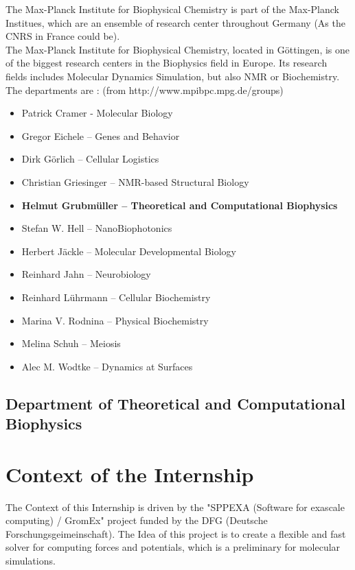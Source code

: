 \documentclass[11pt,twoside,a4paper]{report}
\begin{document}
The Max-Planck Institute for Biophysical Chemistry is part of the Max-Planck Institues, which are an ensemble of research center throughout Germany (As the CNRS in France could be).\\

The Max-Planck Institute for Biophysical Chemistry, located in Göttingen, is one of the biggest research centers in the Biophysics field in Europe. Its research fields includes Molecular Dynamics Simulation, but also NMR or Biochemistry.\\
The departments are : (from http://www.mpibpc.mpg.de/groups)
\begin{itemize}
\item Patrick Cramer - Molecular Biology
\item Gregor Eichele – Genes and Behavior
\item Dirk Görlich – Cellular Logistics
\item Christian Griesinger – NMR-based Structural  Biology
\item \textbf{Helmut Grubmüller – Theoretical and Computational Biophysics}
\item Stefan W. Hell – NanoBiophotonics
\item Herbert Jäckle – Molecular Developmental Biology
\item Reinhard Jahn – Neurobiology
\item Reinhard Lührmann – Cellular Biochemistry
\item Marina V. Rodnina – Physical Biochemistry
\item Melina Schuh – Meiosis 
\item Alec M. Wodtke – Dynamics at Surfaces
\end{itemize}




\section*{Department of Theoretical and Computational Biophysics}


\chapter{Context of the Internship}

The Context of this Internship is driven by the "SPPEXA (Software for exascale computing) / GromEx" project funded by the DFG (Deutsche Forschungsgeimeinschaft).
The Idea of this project is to create a flexible and fast solver for computing forces and potentials, which is a preliminary for molecular simulations.
\end{document}
